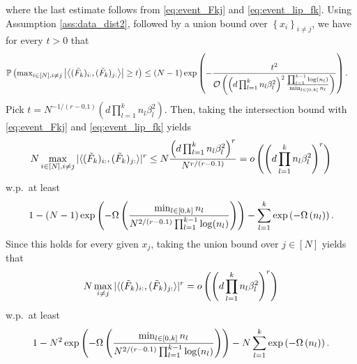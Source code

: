 \documentclass[11pt]{article}
\def\Set#1{\left\{ #1 \right\}}
\newcommand{\littleO}[1]{o\left(#1\right)}
\newcommand{\bigO}[1]{\mathcal{O}\left(#1\right)}
\newcommand{\bigOmg}[1]{\Omega\left(#1\right)}
\newcommand{\inner}[1]{\left\langle#1\right\rangle}
\newcommand{\bigexp}[1]{\exp\left(#1\right)}
\newcommand{\abs}[1]{\left|#1\right|}
\def\min{\mathop{\rm min}\nolimits}
\def\max{\mathop{\rm max}\nolimits}
\begin{document}
    where the last estimate follows from \eqref{eq:event_Fkj} and \eqref{eq:event_lip_fk}.
    Using Assumption \ref{ass:data_dist2}, followed by a union bound over $\Set{x_i}_{i\neq j}$, we have for every $t>0$ that
    \begin{align}\label{eq:TSineq3}
	\mathbb P\left( \max_{i\in[N], i\neq j} \abs{\inner{(\tilde{F}_{k})_{i:}, (\tilde{F}_{k})_{j:}}} \geq t \right)
	&\leq (N-1) \bigexp{- \frac{t^2}{ \bigO{\left(d\prod_{l=1}^{k}n_l\beta_l^2\right)^2  \frac{\prod_{l=1}^{k-1}\log(n_l)}{\min_{l\in[0,k]}n_l} } } } .
    \end{align}
    Pick $t=N^{-1/(r-0.1)} \left( d \prod_{l=1}^{k} n_l\beta_l^2 \right)$. 
    Then, taking the intersection bound with \eqref{eq:event_Fkj} and \eqref{eq:event_lip_fk} yields 
    \begin{align}\label{eq:svmin_offdiag0}
	N\max\limits_{i\in[N], i\neq j} | \langle(\tilde{F}_{k})_{i:}, (\tilde{F}_{k})_{j:}\rangle |^r 
	\leq N\frac{\left( d \prod_{l=1}^{k} n_l\beta_l^2 \right)^r}{N^{r/(r-0.1)}} 
	= \littleO{ \left(d \prod_{l=1}^{k} n_l\beta_l^2\right)^r } 
    \end{align}
    w.p.\ at least
    \begin{align*}
	1 - (N-1) \bigexp{ - \bigOmg{ \frac{\min_{l\in[0,k]}n_l}{N^{2/(r-0.1)} \prod_{l=1}^{k-1}\log(n_l)} } } - \sum_{l=1}^{k} \bigexp{-\bigOmg{n_l}} .
    \end{align*}
    Since this holds for every given $x_j$, taking the union bound over $j\in[N]$ yields that 
    \begin{align}\label{eq:svmin_offdiag}
	N\max\limits_{i\neq j} | \langle(\tilde{F}_{k})_{i:}, (\tilde{F}_{k})_{j:}\rangle |^r
	= \littleO{ \left(d \prod_{l=1}^{k} n_l\beta_l^2\right)^r } 
    \end{align}
    w.p.\ at least
    \begin{align}\label{eq:problemma2}
	1 - N^2 \bigexp{ - \bigOmg{ \frac{\min_{l\in[0,k]}n_l}{N^{2/(r-0.1)} \prod_{l=1}^{k-1}\log(n_l)} } } - N \sum_{l=1}^{k} \bigexp{-\bigOmg{n_l}} .
    \end{align}
\end{document}
